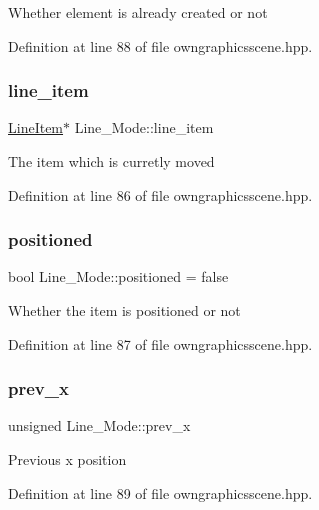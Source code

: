 Whether element is already created or not 

Definition at line 88 of file owngraphicsscene.\+hpp.

\mbox{\label{structLine__Mode_a4e11b31f28505579f3dfcde54b27ecac}} 
\subsubsection{\texorpdfstring{line\+\_\+item}{line\_item}}
{\footnotesize\ttfamily \mbox{\hyperlink{classLineItem}{Line\+Item}}$\ast$ Line\+\_\+\+Mode\+::line\+\_\+item}

The item which is curretly moved 

Definition at line 86 of file owngraphicsscene.\+hpp.

\mbox{\label{structLine__Mode_aefbb8555f406d47d742491003a6afde1}} 
\subsubsection{\texorpdfstring{positioned}{positioned}}
{\footnotesize\ttfamily bool Line\+\_\+\+Mode\+::positioned = false}

Whether the item is positioned or not 

Definition at line 87 of file owngraphicsscene.\+hpp.

\mbox{\label{structLine__Mode_a8bbcbaff29a7810e066e99174e562371}} 
\subsubsection{\texorpdfstring{prev\+\_\+x}{prev\_x}}
{\footnotesize\ttfamily unsigned Line\+\_\+\+Mode\+::prev\+\_\+x}

Previous x position 

Definition at line 89 of file owngraphicsscene.\+hpp.

\mbox{\label{structLine__Mode_a8d5fb940f686955ead3f368a8d3b9016}} 
